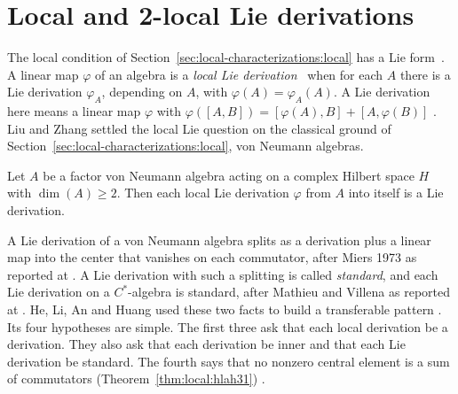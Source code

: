 \section{Local and 2-local Lie derivations}\label{sec:local-characterizations:local-lie-jordan}

The local condition of Section~\ref{sec:local-characterizations:local} has a
Lie form~\cite[p.~209]{LiuZhang2017LocalLie}. A linear map $\varphi$ of an algebra is a \emph{local Lie
derivation}~\cite[p.~209]{LiuZhang2017LocalLie} when for each $A$ there is a
Lie derivation $\varphi_A$, depending on $A$, with $\varphi(A)=\varphi_A(A)$.
A Lie derivation here means a linear map $\varphi$ with
$\varphi([A,B])=[\varphi(A),B]+[A,\varphi(B)]$
\cite[p.~209]{LiuZhang2017LocalLie}. Liu and Zhang settled the local Lie
question on the classical ground of
Section~\ref{sec:local-characterizations:local}, von Neumann algebras.

\begin{theorem}\label{thm:local:liuzhang}
Let $A$ be a factor von Neumann algebra acting on a complex Hilbert space
$H$ with $\dim(A)\geq 2$. Then each local Lie derivation $\varphi$ from
$A$ into itself is a Lie derivation.
\end{theorem}

A Lie derivation of a von Neumann algebra splits as a derivation plus a linear
map into the center that vanishes on each commutator, after Miers 1973 as
reported at \cite[p.~209]{LiuZhang2017LocalLie}. A Lie derivation with such a
splitting is called \emph{standard}, and each Lie derivation on a
$C^*$-algebra is standard, after Mathieu and Villena as reported at
\cite[p.~725]{HeLiAnHuang2018}. He, Li, An and Huang used these two facts to
build a transferable pattern \cite[p.~727]{HeLiAnHuang2018}. Its four
hypotheses are simple. The first three ask that each local derivation be a
derivation. They also ask that each derivation be inner and that each Lie
derivation be standard. The fourth says that no nonzero central element is a
sum of commutators (Theorem~\ref{thm:local:hlah31})
\cite[p.~727]{HeLiAnHuang2018}. %

